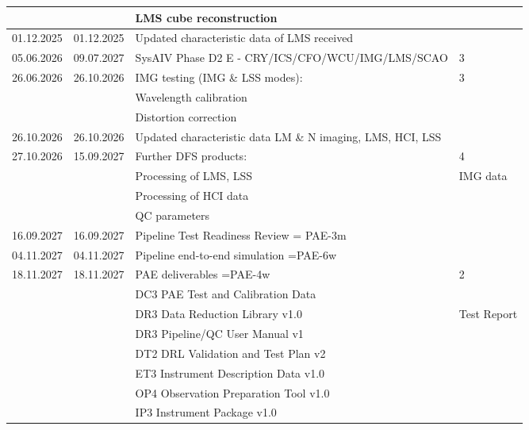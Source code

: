 \begin{table}
\begin{tabularx}{\textwidth}{llll}
    &          & LMS cube reconstruction                                      &	\\
\hline
01.12.2025 & 01.12.2025 & 	Updated characteristic data of LMS received		  &   \\
05.06.2026 & 09.07.2027 &	SysAIV Phase D2 E - CRY/ICS/CFO/WCU/IMG/LMS/SCAO            &   3 \\
26.06.2026 & 26.10.2026 &	IMG testing (IMG \& LSS modes):                   &	3 \\
   &           & Wavelength calibration        	                           & \\   
   &           & Distortion correction                                        & \\
\hline
26.10.2026 & 26.10.2026 & Updated characteristic data LM \& N imaging, LMS, HCI, LSS      & 	\\
\hline
27.10.2026 & 15.09.2027 &	Further DFS products:		                      &	4 \\
    &          &  Processing of LMS, LSS & IMG data                           &	\\
    &          &  Processing of HCI data                                      &	\\
    &          &    QC parameters					            &	\\
\hline
16.09.2027 & 16.09.2027 &	Pipeline Test Readiness Review = PAE-3m			  &	\\
\hline
04.11.2027 & 04.11.2027 &	Pipeline end-to-end simulation  =PAE-6w			  &	\\
\hline
18.11.2027 & 18.11.2027 &	PAE deliverables =PAE-4w                             &	2 \\
           &               &	DC3 PAE Test and Calibration Data                           &	\\
           &               &	DR3 Data Reduction Library v1.0 & Test Report               &	\\
           &               &	DR3 Pipeline/QC User Manual v1                              &	\\
           &	     	   &    DT2 DRL Validation and Test Plan v2                         &	\\
           &      	   &	ET3 Instrument Description Data v1.0                        &	\\
           &   		   &	OP4 Observation Preparation Tool v1.0                       &	\\
           &	   	   &	IP3 Instrument Package v1.0				    &	\\

\end{tabularx}
\end{table}

